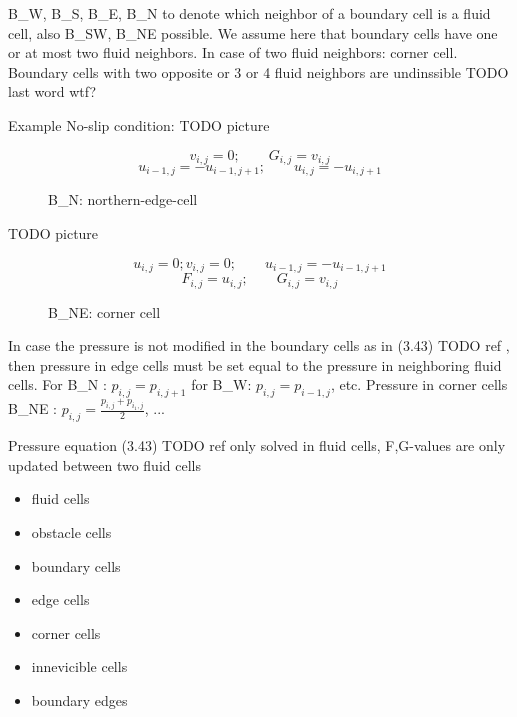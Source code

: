 B\_W, B\_S, B\_E, B\_N to denote which neighbor of a boundary cell is a fluid cell, also B\_SW, B\_NE possible. We assume here that boundary cells have one or at most two fluid neighbors. In case of two fluid neighbors: corner cell. Boundary cells with two opposite or 3 or 4 fluid neighbors are undinssible TODO last word wtf?

Example No-slip condition:
TODO picture
\begin{figure}[H]
	\centering
	\[ v_{i,j} = 0; \qquad G_{i,j} = v_{i,j} \]
	\[ u_{i-1,j} = -u_{i-1,j+1}; \qquad u_{i,j} = - u_{i,j+1} \]
	\renewcommand{\thefigure}{TODO}
	\caption{B\_N: northern-edge-cell}
	\label{fig:disc-freesplipb}
\end{figure}

TODO picture
\begin{figure}[H]
	\centering
	\[ u_{i,j} = 0; v_{i,j} = 0; \qquad u_{i-1,j} = - u_{i-1,j+1} \]
	\[ F_{i,j} = u_{i,j}; \qquad G_{i,j} = v_{i,j} \]
	\renewcommand{\thefigure}{3.53}
	\caption{B\_NE: corner cell}
	\label{fig:disc-freesplipb}
\end{figure}

In case the pressure is not modified in the boundary cells as in (3.43) TODO ref
, then pressure in edge cells must be set equal to the pressure in neighboring fluid cells. For B\_N : $p_{i,j} = p_{i,j+1}$ for B\_W: $p_{i,j} = p_{i-1,j}$, etc. Pressure in corner cells B\_NE : $p_{i,j} = \frac{p_{i,j} + p_{i_1,j}}{2}$, ...

Pressure equation (3.43) TODO ref
only solved in fluid cells, F,G-values are only updated between two fluid cells
\begin{itemize}
	\item fluid cells
	\item obstacle cells
	\item boundary cells
	\item edge cells
	\item corner cells
	\item innevicible cells
	\item boundary edges
\end{itemize}
